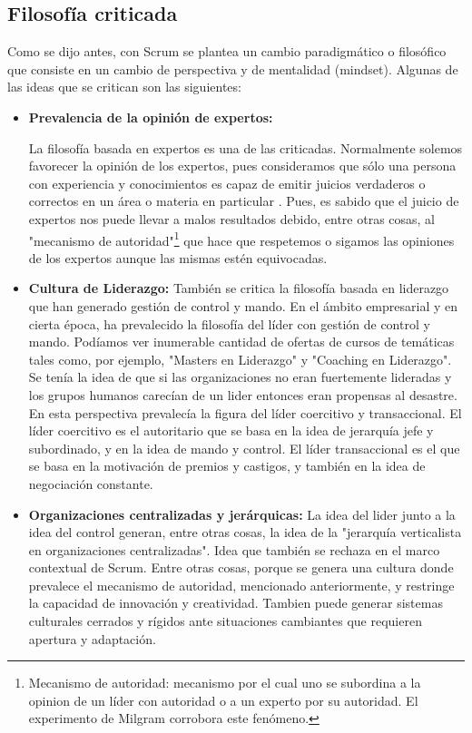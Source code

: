 \subsection{Filosofía criticada}

Como se dijo antes, con Scrum se plantea un cambio paradigmático o filosófico que consiste en un cambio de perspectiva y de mentalidad (mindset). Algunas de las ideas que se critican son las siguientes:

\begin{itemize}

\item \textbf{Prevalencia de la opinión de expertos: }

La filosofía basada en expertos es una de las criticadas. Normalmente solemos favorecer la opinión de los expertos, pues consideramos que sólo una persona con experiencia y conocimientos es capaz de emitir juicios verdaderos o correctos en un área o materia en particular \cite{James-Surowiecki-2005}. Pues, es sabido que el juicio de expertos nos puede llevar a malos resultados debido, entre otras cosas, al "mecanismo de autoridad"\footnote{Mecanismo de autoridad: mecanismo por el cual uno se subordina a la opinion de un líder con autoridad o a un experto por su autoridad. El experimento de Milgram corrobora este fenómeno.} que hace que respetemos o sigamos las opiniones de los expertos aunque las mismas estén equivocadas.

\item \textbf{Cultura de Liderazgo: }
También se critica la filosofía basada en liderazgo que han generado gestión de control y mando. En el ámbito empresarial y en cierta época, ha prevalecido la filosofía del líder con gestión de control y mando. Podíamos ver inumerable cantidad de ofertas de cursos de temáticas tales como, por ejemplo, "Masters en Liderazgo" y "Coaching en Liderazgo". Se tenía la idea de que si las organizaciones no eran fuertemente lideradas y los grupos humanos carecían de un lider entonces eran propensas al desastre. En esta perspectiva prevalecía la figura del líder coercitivo y transaccional. El líder coercitivo es el autoritario que se basa en la idea de jerarquía jefe y subordinado, y en la idea de mando y control. El líder transaccional es el que se basa en la motivación de premios y castigos, y también en la idea de negociación constante.

\item \textbf{Organizaciones centralizadas y jerárquicas: }
La idea del lider junto a la idea del control generan, entre otras cosas, la idea de la "jerarquía verticalista en organizaciones centralizadas". Idea que también se rechaza en el marco contextual de Scrum. Entre otras cosas, porque se genera una cultura donde prevalece el mecanismo de autoridad, mencionado anteriormente, y restringe la capacidad de innovación y creatividad. Tambien puede generar sistemas culturales cerrados y rígidos ante situaciones cambiantes que requieren apertura y adaptación.


\end{itemize}
